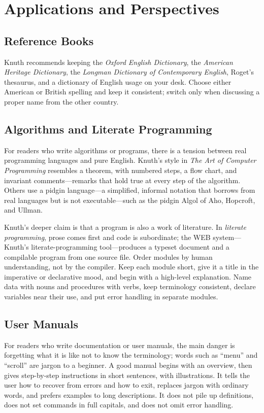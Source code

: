 \documentclass[11pt]{article}
\begin{document}
\section{Applications and Perspectives}

\subsection{Reference Books}

Knuth recommends keeping the \emph{Oxford English Dictionary}, the \emph{American Heritage Dictionary}, the \emph{Longman Dictionary of Contemporary English}, Roget's thesaurus, and a dictionary of English usage on your desk. Choose either American or British spelling and keep it consistent; switch only when discussing a proper name from the other country.

\subsection{Algorithms and Literate Programming}

For readers who write algorithms or programs, there is a tension between real programming languages and pure English. Knuth's style in \emph{The Art of Computer Programming} resembles a theorem, with numbered steps, a flow chart, and invariant comments---remarks that hold true at every step of the algorithm. Others use a pidgin language---a simplified, informal notation that borrows from real languages but is not executable---such as the pidgin Algol of Aho, Hopcroft, and Ullman.

Knuth's deeper claim is that a program is also a work of literature. In \emph{literate programming}, prose comes first and code is subordinate; the WEB system---Knuth's literate-programming tool---produces a typeset document and a compilable program from one source file. Order modules by human understanding, not by the compiler. Keep each module short, give it a title in the imperative or declarative mood, and begin with a high-level explanation. Name data with nouns and procedures with verbs, keep terminology consistent, declare variables near their use, and put error handling in separate modules.

\subsection{User Manuals}

For readers who write documentation or user manuals, the main danger is forgetting what it is like not to know the terminology; words such as ``menu'' and ``scroll'' are jargon to a beginner. A good manual begins with an overview, then gives step-by-step instructions in short sentences, with illustrations. It tells the user how to recover from errors and how to exit, replaces jargon with ordinary words, and prefers examples to long descriptions. It does not pile up definitions, does not set commands in full capitals, and does not omit error handling.
\end{document}
